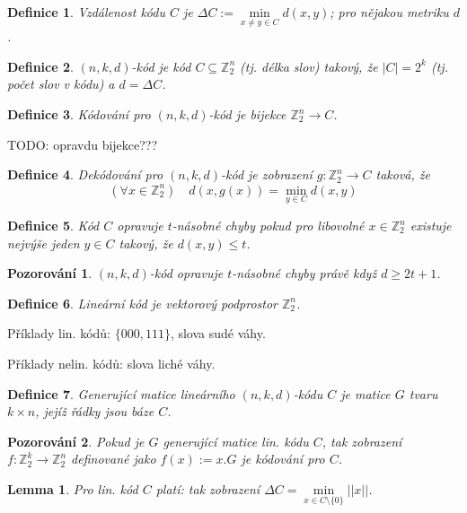 \documentclass[a4paper,10pt,titlepage]{article} \usepackage[utf8]{inputenc}
\newtheorem{define}{Definice}
\newtheorem*{observ}{Pozorování}
\newtheorem*{lemma}{Lemma}
\begin{document}
\begin{define}
Vzdálenost kódu $C$ je $\Delta C := \min\limits_{x \neq y \in C} d(x,y)$; pro nějakou metriku $d$.
\end{define}

\begin{define}
$(n,k,d)$-kód je kód $C \subseteq \mathbb{Z}^n_2$ (tj. délka slov) takový, že $|C| = 2^k$ (tj. počet slov v kódu) a $d = \Delta C$.
\end{define}

\begin{define}
Kódování pro $(n,k,d)$-kód je bijekce $\mathbb{Z}^n_2 \rightarrow C$.
\end{define}

TODO: opravdu bijekce???

\begin{define}
Dekódování pro $(n,k,d)$-kód je zobrazení $g: \mathbb{Z}^n_2 \rightarrow C$ taková, že
$$
(\forall x \in \mathbb{Z}^n_2)\quad d(x,g(x)) = \min\limits_{y \in C} d(x,y)
$$
\end{define}

\begin{define}
Kód $C$ opravuje $t$-násobné chyby pokud pro libovolné $x \in \mathbb{Z}^n_2$ existuje nejvýše jeden $y \in C$ takový, že $d(x,y) \leq t$.
\end{define}

\begin{observ}
$(n,k,d)$-kód opravuje $t$-násobné chyby právě když $d \geq 2t+1$.
\end{observ}

\begin{define}
Lineární kód je vektorový podprostor $\mathbb{Z}^n_2$.
\end{define}

Příklady lin. kódů: $\{000,111\}$, slova sudé váhy.

Příklady nelin. kódů: slova liché váhy.

\begin{define}
Generující matice lineárního $(n,k,d)$-kódu $C$ je matice $G$ tvaru $k \times n$, jejíž řádky jsou báze $C$.
\end{define}

\begin{observ}
Pokud je $G$ generující matice lin. kódu $C$, tak zobrazení $f: \mathbb{Z}^k_2 \rightarrow \mathbb{Z}^n_2$ definované jako $f(x) := x.G$ je kódování pro $C$.
\end{observ}

\begin{lemma}
Pro lin. kód $C$ platí: tak zobrazení $\Delta C = \min\limits_{x \in C \setminus \{0\}} ||x||$.
\end{lemma}
\end{document}

